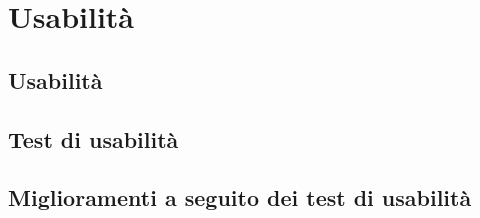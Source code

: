 \chapter{Usabilità}
    \section{Usabilità}

    \section{Test di usabilità} %

    \section{Miglioramenti a seguito dei test di usabilità}